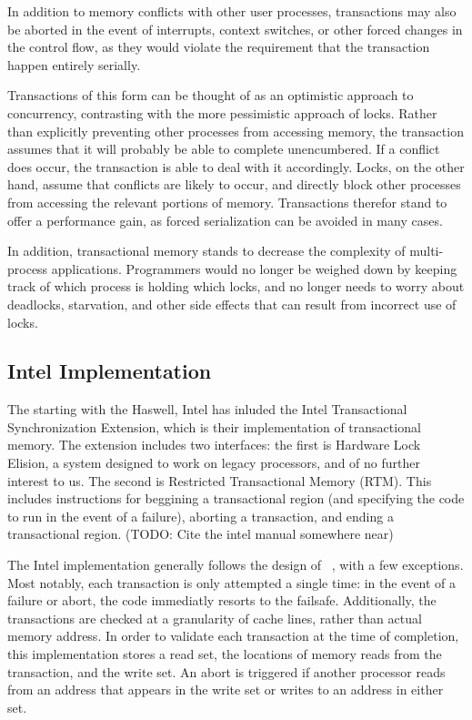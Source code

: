 \documentclass{acm_proc_article-sp}
\begin{document}
In addition to memory conflicts with other user processes, 
transactions may also be aborted in the event of interrupts, context switches,
or other forced changes in the control flow, as they would violate the
requirement that the transaction happen entirely serially. 

Transactions of this form can be thought of as an optimistic approach to
concurrency, contrasting with the more pessimistic approach of locks. 
Rather than explicitly preventing other processes from accessing memory, the
transaction assumes that it will probably be able to complete unencumbered. If
a conflict does occur, the transaction is able to deal with it accordingly.
Locks, on the other hand, assume that conflicts are likely to occur, and 
directly block other processes from accessing the relevant portions of memory.
Transactions therefor stand to offer a performance gain, as forced 
serialization can be avoided in many cases.

In addition, transactional memory stands to decrease the complexity of 
multi-process applications. Programmers would no longer be weighed down by 
keeping track of which process is holding which locks, and no longer needs
to worry about deadlocks, starvation, and other side effects that can result
from incorrect use of locks.

\subsection{Intel Implementation}

The starting with the Haswell, Intel has inluded the Intel Transactional
Synchronization Extension, which is their implementation of transactional
memory. The extension includes two interfaces: the first is Hardware Lock
Elision, a system designed to work on legacy processors, and of no further
interest to us. The second is Restricted Transactional Memory (RTM). This 
includes instructions for beggining a transactional region (and specifying the
code to run in the event of a failure), aborting a transaction, and ending a 
transactional region. (TODO: Cite the intel manual somewhere near)

The Intel implementation generally follows the design of 
~\cite{Herlihy:1993:TMA:173682.165164}, with a few exceptions.
Most notably, each transaction is only attempted a single time: in the event
of a failure or abort, the code immediatly resorts to the failsafe. 
Additionally, the transactions are checked at a granularity of cache lines, 
rather than actual memory address. In order to validate each transaction at the
time of completion, this implementation stores a read set, the locations of
memory reads from the transaction, and the write set. An abort is triggered
if another processor reads from an address that appears in the write set or 
writes to an address in either set.
\end{document}
